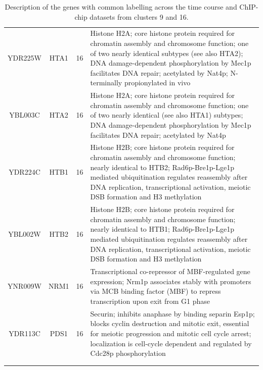 \documentclass[]{article}
\begin{document}
\begin{longtable}{@{\extracolsep{3pt}} cccp{85mm}}
YDR225W & HTA1 & 16 & Histone H2A; core histone protein required for chromatin assembly and chromosome function; one of two nearly identical subtypes (see also HTA2); DNA damage-dependent phosphorylation by Mec1p facilitates DNA repair; acetylated by Nat4p; N-terminally propionylated in vivo \\ 
YBL003C & HTA2 & 16 & Histone H2A; core histone protein required for chromatin assembly and chromosome function; one of two nearly identical (see also HTA1) subtypes; DNA damage-dependent phosphorylation by Mec1p facilitates DNA repair; acetylated by Nat4p \\ 
YDR224C & HTB1 & 16 & Histone H2B; core histone protein required for chromatin assembly and chromosome function; nearly identical to HTB2; Rad6p-Bre1p-Lge1p mediated ubiquitination regulates reassembly after DNA replication, transcriptional activation, meiotic DSB formation and H3 methylation \\ 
YBL002W & HTB2 & 16 & Histone H2B; core histone protein required for chromatin assembly and chromosome function; nearly identical to HTB1; Rad6p-Bre1p-Lge1p mediated ubiquitination regulates reassembly after DNA replication, transcriptional activation, meiotic DSB formation and H3 methylation \\ 
YNR009W & NRM1 & 16 & Transcriptional co-repressor of MBF-regulated gene expression; Nrm1p associates stably with promoters via MCB binding factor (MBF) to repress transcription upon exit from G1 phase \\ 
YDR113C & PDS1 & 16 & Securin; inhibits anaphase by binding separin Esp1p; blocks cyclin destruction and mitotic exit, essential for meiotic progression and mitotic cell cycle arrest; localization is cell-cycle dependent and regulated by Cdc28p phosphorylation \\   \hline \\ [-1.8ex] 
\caption{Description of the genes with common labelling across the time course  and ChIP-chip datasets from clusters 9 and 16.}
\label{tab:timecoursChIPchipFusedCl916}
\end{longtable} 
%
\end{document}
